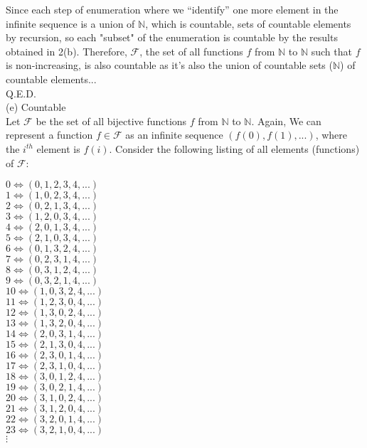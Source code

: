 \documentclass{article}
\begin{document}
Since each step of enumeration where we ``identify'' one more element in the infinite sequence is a union of $\mathbb{N}$, which is countable, sets of countable elements by recursion, so each "subset" of the enumeration is countable by the results obtained in 2(b).
Therefore, $\mathscr{F}$, the set of all functions $f$ from $\mathbb{N}$ to $\mathbb{N}$ such that $f$ is non-increasing, is also countable as it's also the union of countable sets ($\mathbb{N}$) of countable elements... \\

Q.E.D. \pagebreak\\
(e) Countable \\

Let $\mathscr{F}$ be the set of all bijective functions $f$ from $\mathbb{N}$ to $\mathbb{N}$.
Again, We can represent a function $f\in\mathscr{F}$ as an infinite sequence $(f(0), f(1), ...)$, where the $i^{th}$ element is $f(i)$. Consider the following listing of all elements (functions) of $\mathscr{F}$:

\begin{center}
$0\iff (0, 1, 2, 3, 4, ...)$ \\ [.3cm]

$1\iff (1, 0, 2, 3, 4, ...)$ \\ [.3cm]

$2\iff (0, 2, 1, 3, 4, ...)$ \\
$3\iff (1, 2, 0, 3, 4, ...)$ \\
$4\iff (2, 0, 1, 3, 4, ...)$ \\
$5\iff (2, 1, 0, 3, 4, ...)$ \\ [.3cm]

$6\iff (0, 1, 3, 2, 4, ...)$ \\
$7\iff (0, 2, 3, 1, 4, ...)$ \\
$8\iff (0, 3, 1, 2, 4, ...)$ \\
$9\iff (0, 3, 2, 1, 4, ...)$ \\
$10\iff (1, 0, 3, 2, 4, ...)$ \\
$11\iff (1, 2, 3, 0, 4, ...)$ \\
$12\iff (1, 3, 0, 2, 4, ...)$ \\
$13\iff (1, 3, 2, 0, 4, ...)$ \\
$14\iff (2, 0, 3, 1, 4, ...)$ \\
$15\iff (2, 1, 3, 0, 4, ...)$ \\
$16\iff (2, 3, 0, 1, 4, ...)$ \\
$17\iff (2, 3, 1, 0, 4, ...)$ \\
$18\iff (3, 0, 1, 2, 4, ...)$ \\
$19\iff (3, 0, 2, 1, 4, ...)$ \\
$20\iff (3, 1, 0, 2, 4, ...)$ \\
$21\iff (3, 1, 2, 0, 4, ...)$ \\
$22\iff (3, 2, 0, 1, 4, ...)$ \\
$23\iff (3, 2, 1, 0, 4, ...)$ \\
$\vdots$
\end{center}
\end{document}

